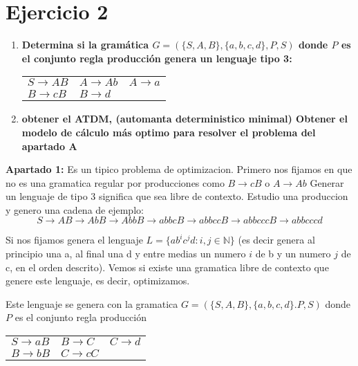 \documentclass{article}
\begin{document}
        \section{Ejercicio 2}
        \begin{enumerate}
            \item \textbf{Determina si la gramática $G = (\{S,A,B\}, \{a,b,c,d\}, P,S)$ donde $P$ es el conjunto regla producción
            genera un lenguaje tipo 3:}
            
            \begin{tabularx}{\textwidth}{XXX}
                $S \rightarrow AB$ & $A \rightarrow Ab$ & $A \rightarrow a$\\
                $B \rightarrow cB$ & $B \rightarrow d$\\
            \end{tabularx}
            
            \item \textbf{obtener el ATDM, (automanta deterministico minimal)
            Obtener el modelo de cálculo más optimo para resolver el problema del apartado A}
        \end{enumerate}
        

        \textbf{Apartado 1:}
        Es un tipico problema de optimizacion. Primero nos fijamos en que no es una gramatica regular por producciones
        como $B \rightarrow cB$ o $A \rightarrow Ab$
        Generar un lenguaje de tipo 3 significa que sea libre de contexto.
        Estudio una produccion y genero una cadena de ejemplo:
        $$ S \rightarrow AB \rightarrow AbB \rightarrow AbbB \rightarrow abbcB \rightarrow abbccB \rightarrow abbcccB \rightarrow abbcccd$$ 

        Si nos fijamos genera el lenguaje $L = \{ab^ic^jd : i, j \in \mathbb{N}  \}$ (es decir genera al principio una a, al final una d y entre medias un numero $i$ de b y un numero $j$ de c, en el orden descrito). Vemos si existe una gramatica libre de contexto que genere este lenguaje,
        es decir, optimizamos.

        \vspace{\baselineskip} %
        Este lenguaje se genera con la gramatica $G = (\{S,A,B\}, \{a,b,c,d\}. P,S)$ donde $P$ es el conjunto regla producción
        \vspace{\baselineskip} %

        \begin{tabularx}{\textwidth}{XXX}
            $S \rightarrow aB$ & $B \rightarrow C$ & $C \rightarrow d$\\
            $B \rightarrow bB$ & $C \rightarrow cC$\\
        \end{tabularx}
\end{document}
